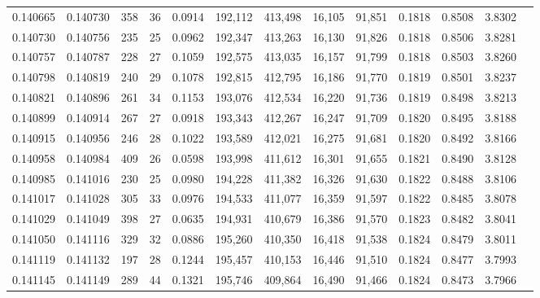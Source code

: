\begin{tabular}{rrrrrrrrrrrrr}
0.140665 & 0.140730 &   358 &  36 &                                     0.0914 & 192,112 & 413,498 &  16,105 &  91,851 & 0.1818 & 0.8508 & 3.8302 \\
0.140730 & 0.140756 &   235 &  25 &                                     0.0962 & 192,347 & 413,263 &  16,130 &  91,826 & 0.1818 & 0.8506 & 3.8281 \\
0.140757 & 0.140787 &   228 &  27 &                                     0.1059 & 192,575 & 413,035 &  16,157 &  91,799 & 0.1818 & 0.8503 & 3.8260 \\
0.140798 & 0.140819 &   240 &  29 &                                     0.1078 & 192,815 & 412,795 &  16,186 &  91,770 & 0.1819 & 0.8501 & 3.8237 \\
0.140821 & 0.140896 &   261 &  34 &                                     0.1153 & 193,076 & 412,534 &  16,220 &  91,736 & 0.1819 & 0.8498 & 3.8213 \\
0.140899 & 0.140914 &   267 &  27 &                                     0.0918 & 193,343 & 412,267 &  16,247 &  91,709 & 0.1820 & 0.8495 & 3.8188 \\
0.140915 & 0.140956 &   246 &  28 &                                     0.1022 & 193,589 & 412,021 &  16,275 &  91,681 & 0.1820 & 0.8492 & 3.8166 \\
0.140958 & 0.140984 &   409 &  26 &                                     0.0598 & 193,998 & 411,612 &  16,301 &  91,655 & 0.1821 & 0.8490 & 3.8128 \\
0.140985 & 0.141016 &   230 &  25 &                                     0.0980 & 194,228 & 411,382 &  16,326 &  91,630 & 0.1822 & 0.8488 & 3.8106 \\
0.141017 & 0.141028 &   305 &  33 &                                     0.0976 & 194,533 & 411,077 &  16,359 &  91,597 & 0.1822 & 0.8485 & 3.8078 \\
0.141029 & 0.141049 &   398 &  27 &                                     0.0635 & 194,931 & 410,679 &  16,386 &  91,570 & 0.1823 & 0.8482 & 3.8041 \\
0.141050 & 0.141116 &   329 &  32 &                                     0.0886 & 195,260 & 410,350 &  16,418 &  91,538 & 0.1824 & 0.8479 & 3.8011 \\
0.141119 & 0.141132 &   197 &  28 &                                     0.1244 & 195,457 & 410,153 &  16,446 &  91,510 & 0.1824 & 0.8477 & 3.7993 \\
0.141145 & 0.141149 &   289 &  44 &                                     0.1321 & 195,746 & 409,864 &  16,490 &  91,466 & 0.1824 & 0.8473 & 3.7966 \\

\end{tabular}
